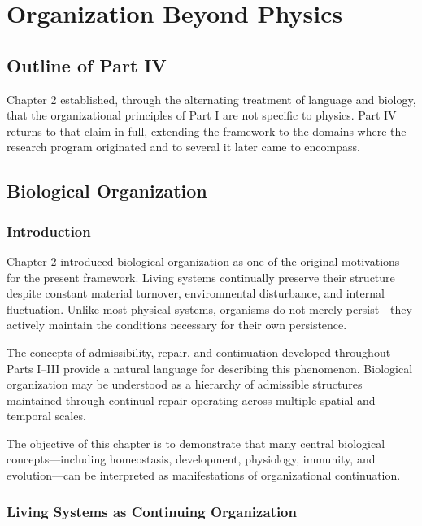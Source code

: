 \documentclass[11pt,oneside]{book}
\numberwithin{equation}{chapter}
\theoremstyle{definition}
\theoremstyle{plain}
\begin{document}
\part{Organization Beyond Physics}

\chapter*{Outline of Part IV}

Chapter 2 established, through the alternating treatment of language and
biology, that the organizational principles of Part I are not specific to
physics. Part IV returns to that claim in full, extending the framework to
the domains where the research program originated and to several it later
came to encompass.

\chapter{Biological Organization}

\section{Introduction}

Chapter 2 introduced biological organization as one of the original
motivations for the present framework. Living systems continually preserve
their structure despite constant material turnover, environmental
disturbance, and internal fluctuation. Unlike most physical systems,
organisms do not merely persist---they actively maintain the conditions
necessary for their own persistence.

The concepts of admissibility, repair, and continuation developed throughout
Parts I--III provide a natural language for describing this phenomenon.
Biological organization may be understood as a hierarchy of admissible
structures maintained through continual repair operating across multiple
spatial and temporal scales.

The objective of this chapter is to demonstrate that many central biological
concepts---including homeostasis, development, physiology, immunity, and
evolution---can be interpreted as manifestations of organizational
continuation.

\section{Living Systems as Continuing Organization}
\end{document}
